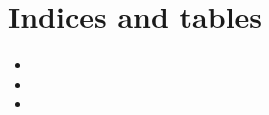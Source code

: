 \documentclass[a4paper,10pt,english]{sphinxmanual}
\begin{document}
\section{Indices and tables}
\label{\detokenize{indices::doc}}\label{\detokenize{indices:indices-and-tables}}\begin{itemize}
\item {} 

\item {} 

\item {} 

\end{itemize}



\renewcommand{\indexname}{Index}
\printindex
\end{document}
